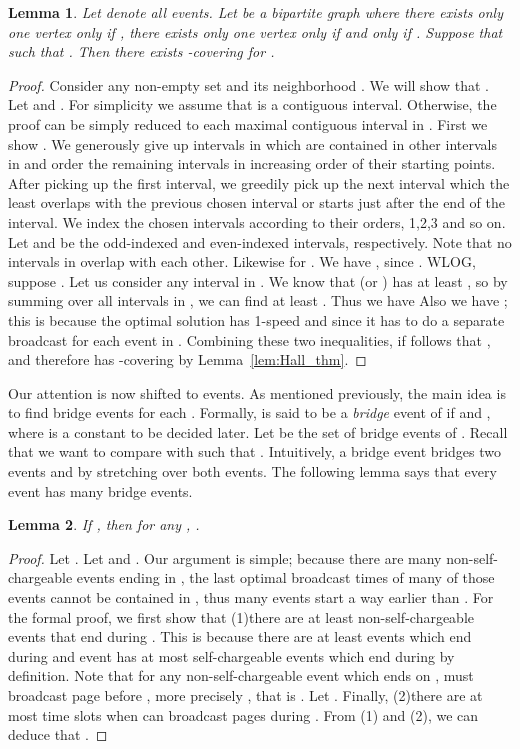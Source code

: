 \documentclass[11pt]{article}
\newtheorem{lemma}{Lemma}[section]
\begin{document}
\begin{titlepage}
\begin{lemma}
    \label{lem:cover2}
    Let  denote all events. Let  be a bipartite graph where there exists only one vertex  only if ,
    there exists only one vertex  only if  and  only if .
     Suppose that  such that . Then
     there exists -covering for .
\end{lemma}
\begin{proof}
  Consider any non-empty set  and its neighborhood .
  We will show that . Let  and . For simplicity we assume that  is a
  contiguous interval. Otherwise, the proof can be simply reduced to
  each maximal contiguous interval in .  First we show
  . We generously give up
  intervals in  which are contained in other intervals in
   and order the remaining intervals in increasing order
  of their starting points. After picking up the first interval, we
  greedily pick up the next interval which the least overlaps with
  the previous chosen interval or starts just after the end of the interval.
  We index the chosen intervals according
  to their orders, 1,2,3 and so on.  Let  and
   be the odd-indexed and even-indexed intervals,
  respectively. Note that no intervals in  overlap with each other.
  Likewise for . We have , since . WLOG, suppose
  .
  Let us consider any interval  in .
  We know that  (or ) has at least ,
  so by summing over all intervals in , we can find at least
  . Thus we have 
Also we have ; this is because the optimal solution has 1-speed and since it has to do a
separate broadcast for each event in . Combining these two inequalities, if follows that , and therefore  has -covering by Lemma~\ref{lem:Hall_thm}.
\end{proof}


Our attention is now shifted to  events. As mentioned previously, the main idea is to find bridge events for each
. Formally,  is said to be a \emph{bridge} event of  if  and ,
where  is a constant to be decided later. Let  be the set of bridge events of
. Recall that we want to compare  with  such that . Intuitively, a bridge
event  bridges two events  and  by stretching over both events.   The following lemma says
that every  event has many bridge events.

\begin{lemma}
  \label{lem:bdg_num} If , then for any , .
\end{lemma}
\begin{proof}
  Let . Let  and .
  Our argument is simple; because there are many non-self-chargeable events ending in ,
  the last optimal broadcast times of many of those events cannot be contained in , thus many events start a way
  earlier than . For the formal proof, we first show that
  (1)there are at least 
  non-self-chargeable events that end during . This is because
  there are at least  events which end during
   and  event  has at most  self-chargeable events which end during
   by definition. Note that for any non-self-chargeable event  which
  ends on ,  must broadcast  page  before ,
  more precisely , that is . Let .  Finally, (2)there are at most  time slots when 
  can broadcast pages during .
  From (1) and (2), we can deduce that .


\end{proof}
\end{titlepage}
\end{document}
